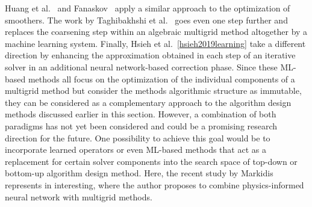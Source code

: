 Huang et al.~\cite{huang2021learning} and Fanaskov~\cite{fanaskov2021neural} apply a similar approach to the optimization of smoothers.
The work by Taghibakhshi et al.~\cite{taghibakhshi2021optimization} goes even one step further and replaces the coarsening step within an algebraic multigrid method altogether by a machine learning system.
Finally, Hsieh et al.~\ref{hsieh2019learning} take a different direction by enhancing the approximation obtained in each step of an iterative solver in an additional neural network-based correction phase.
Since these ML-based methods all focus on the optimization of the individual components of a multigrid method but consider the methods algorithmic structure as immutable, they can be considered as a complementary approach to the algorithm design methods discussed earlier in this section.
However, a combination of both paradigms has not yet been considered and could be a promising research direction for the future.
One possibility to achieve this goal would be to incorporate learned operators or even ML-based methods that act as a replacement for certain solver components into the search space of top-down or bottom-up algorithm design method.
Here, the recent study by Markidis~\cite{markidis2021old} represents in interesting, where the author proposes to combine physics-informed neural network with multigrid methods. 

